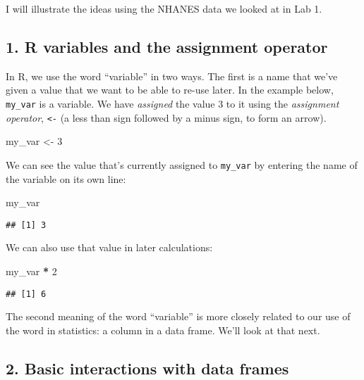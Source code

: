 \documentclass[]{article}
\newenvironment{Shaded}{\begin{snugshade}}{\end{snugshade}}
\newcommand{\DecValTok}[1]{\textcolor[rgb]{0.00,0.00,0.81}{#1}}
\newcommand{\StringTok}[1]{\textcolor[rgb]{0.31,0.60,0.02}{#1}}
\newcommand{\OperatorTok}[1]{\textcolor[rgb]{0.81,0.36,0.00}{\textbf{#1}}}
\newcommand{\NormalTok}[1]{#1}
\begin{document}
I will illustrate the ideas using the NHANES data we looked at in Lab 1.

\subsection{1. R variables and the assignment
operator}\label{r-variables-and-the-assignment-operator}

In R, we use the word ``variable'' in two ways. The first is a name that
we've given a value that we want to be able to re-use later. In the
example below, \texttt{my\_var} is a variable. We have \emph{assigned}
the value 3 to it using the \emph{assignment operator},
\texttt{\textless{}-} (a less than sign followed by a minus sign, to
form an arrow).

\begin{Shaded}
\begin{Highlighting}[]
\NormalTok{my_var <-}\StringTok{ }\DecValTok{3}
\end{Highlighting}
\end{Shaded}

We can see the value that's currently assigned to \texttt{my\_var} by
entering the name of the variable on its own line:

\begin{Shaded}
\begin{Highlighting}[]
\NormalTok{my_var}
\end{Highlighting}
\end{Shaded}

\begin{verbatim}
## [1] 3
\end{verbatim}

We can also use that value in later calculations:

\begin{Shaded}
\begin{Highlighting}[]
\NormalTok{my_var }\OperatorTok{*}\StringTok{ }\DecValTok{2}
\end{Highlighting}
\end{Shaded}

\begin{verbatim}
## [1] 6
\end{verbatim}

The second meaning of the word ``variable'' is more closely related to
our use of the word in statistics: a column in a data frame. We'll look
at that next.

\subsection{2. Basic interactions with data
frames}\label{basic-interactions-with-data-frames}
\end{document}
